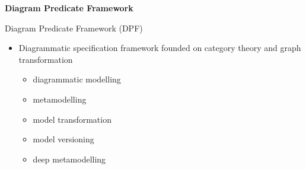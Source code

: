\documentclass[dvips,slidetop,mathserif,red]{beamer}
\begin{document}
\begin{frame}{}
  \begin{center}
    \begin{Huge}
      \textbf{Diagram Predicate Framework}
    \end{Huge}
  \end{center}
\end{frame}

\begin{frame}{Diagram Predicate Framework (DPF)}
  \begin{itemize}
    \item Diagrammatic specification framework founded on category theory and graph transformation
    \begin{itemize}
      \item diagrammatic modelling
      \item metamodelling
      \item model transformation
      \item model versioning
      \item deep metamodelling
    \end{itemize}
  \end{itemize}
\end{frame}
\end{document}
